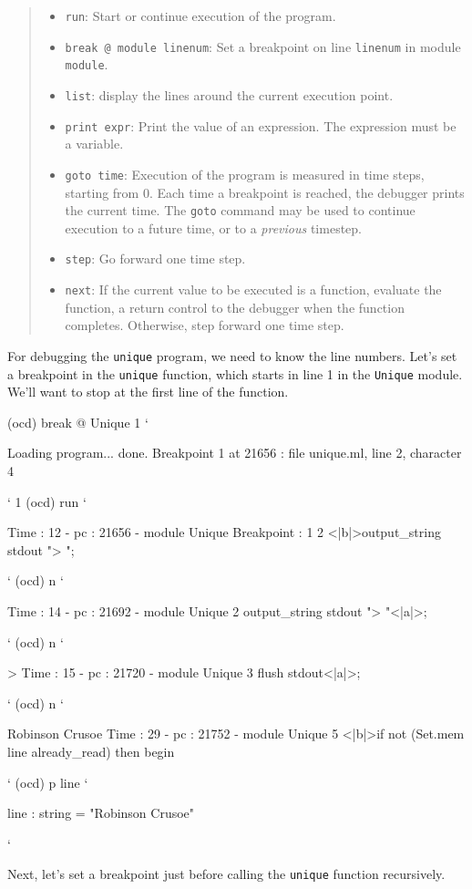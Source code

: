 \begin{quote}
\begin{itemize}
\item \lstinline]run]: Start or continue execution of the program.
\item \lstinline]break @ module linenum]: Set a breakpoint on line \lstinline/linenum/ in module \lstinline/module/.
\item \lstinline]list]: display the lines around the current execution point.
\item \lstinline]print expr]: Print the value of an expression. The expression must be a variable.
\item \lstinline]goto time]:
%
Execution of the program is measured in time steps, starting from
0. Each time a breakpoint is reached, the debugger prints the current
time. The \hbox{\lstinline/goto/} command may be used to continue
execution to a future time, or to a \emph{previous} timestep.

\item \lstinline]step]: Go forward one time step.
\item \lstinline]next]:
%
If the current value to be executed is a function, evaluate the
function, a return control to the debugger when the function
completes. Otherwise, step forward one time step.
\end{itemize}
\end{quote}
%
For debugging the \hbox{\lstinline/unique/} program, we need to know
the line numbers. Let's set a breakpoint in
the \hbox{\lstinline/unique/} function, which starts in line 1 in
the \hbox{\lstinline/Unique/} module. We'll want to stop at the first
line of the function.

\begin{ocamldebug}
(ocd) break @ Unique 1
`
\begin{topoutput}
Loading program... done.
Breakpoint 1 at 21656 : file unique.ml, line 2, character 4
\end{topoutput}
`
1
(ocd) run
`
\begin{topoutput}
Time : 12 - pc : 21656 - module Unique
Breakpoint : 1
2    <|b|>output_string stdout "> ";
\end{topoutput}
`
(ocd) n
`
\begin{topoutput}
Time : 14 - pc : 21692 - module Unique
2    output_string stdout "> "<|a|>;
\end{topoutput}
`
(ocd) n
`
\begin{topoutput}
> Time : 15 - pc : 21720 - module Unique
3    flush stdout<|a|>;
\end{topoutput}
`
(ocd) n
`
\begin{topoutput}
Robinson Crusoe
Time : 29 - pc : 21752 - module Unique
5       <|b|>if not (Set.mem line already_read) then begin
\end{topoutput}
`
(ocd) p line
`
\begin{topoutput}
line : string = "Robinson Crusoe"
\end{topoutput}
`
\end{ocamldebug}
%
Next, let's set a breakpoint just before calling the \hbox{\lstinline/unique/}
function recursively.

